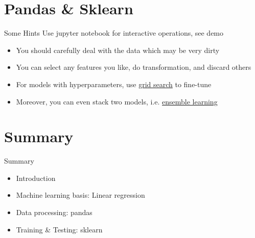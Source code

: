 \documentclass{../TexTemplate/myslide}
\begin{document}
\section{Pandas \& Sklearn}
\begin{frame}
\sectionpage
\end{frame}

\begin{frame}{Some Hints}
\hypertarget{hint}{}
Use jupyter notebook for interactive operations, see demo
\begin{itemize}
	\item You should carefully deal with the data which may be very dirty
	\item You can select any features you like, do transformation, and discard others
	\item For models with hyperparameters, use \href{https://scikit-learn.org/stable/modules/grid_search.html}{grid search} to fine-tune
	\item Moreover, you can even stack two models, i.e. \href{https://en.wikipedia.org/wiki/Ensemble_learning}{ensemble learning}
\end{itemize}
\end{frame}

\section{Summary}
\begin{frame}
\sectionpage
\end{frame}

\begin{frame}{Summary}
\begin{itemize}
	\item Introduction
	\item Machine learning basis: Linear regression
	\item Data processing: pandas
	\item Training \& Testing: sklearn
\end{itemize}
\end{frame}
\end{document}
